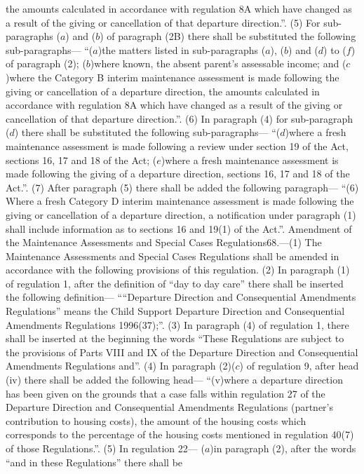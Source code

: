 \documentclass[a4paper]{article}
\begin{document}
the amounts calculated in accordance with regulation 8A which have changed as a
result of the giving or cancellation of that departure direction.”.
(5) For sub-paragraphs ($a$) and ($b$) of paragraph (2B) there shall be substituted
the following sub-paragraphs—
“($a$)the matters listed in sub-paragraphs ($a$), ($b$) and ($d$) to ($f$) of paragraph
(2);
($b$)where known, the absent parent’s assessable income; and
($c$)where the Category B interim maintenance assessment is made following the
giving or cancellation of a departure direction, the amounts calculated in
accordance with regulation 8A which have changed as a result of the giving or
cancellation of that departure direction.”.
(6) In paragraph (4) for sub-paragraph ($d$) there shall be substituted the
following sub-paragraphs—
“($d$)where a fresh maintenance assessment is made following a review under
section 19 of the Act, sections 16, 17 and 18 of the Act;
($e$)where a fresh maintenance assessment is made following the giving of a
departure direction, sections 16, 17 and 18 of the Act.”.
(7) After paragraph (5) there shall be added the following paragraph—
“(6) Where a fresh Category D interim maintenance assessment is made following
the giving or cancellation of a departure direction, a notification under
paragraph (1) shall include information as to sections 16 and 19(1) of the
Act.”.
Amendment of the Maintenance Assessments and Special Cases Regulations68.—(1)
The Maintenance Assessments and Special Cases Regulations shall be amended in
accordance with the following provisions of this regulation.
(2) In paragraph (1) of regulation 1, after the definition of “day to day care”
there shall be inserted the following definition—
““Departure Direction and Consequential Amendments Regulations” means the Child
Support Departure Direction and Consequential Amendments Regulations 1996(37);”.
(3) In paragraph (4) of regulation 1, there shall be inserted at the beginning
the words “These Regulations are subject to the provisions of Parts VIII and IX
of the Departure Direction and Consequential Amendments Regulations and”.
(4) In paragraph (2)($c$) of regulation 9, after head (iv) there shall be added
the following head—
“(v)where a departure direction has been given on the grounds that a case falls
within regulation 27 of the Departure Direction and Consequential Amendments
Regulations (partner’s contribution to housing costs), the amount of the housing
costs which corresponds to the percentage of the housing costs mentioned in
regulation 40(7) of those Regulations.”.
(5) In regulation 22—
($a$)in paragraph (2), after the words “and in these Regulations” there shall be
\end{document}
